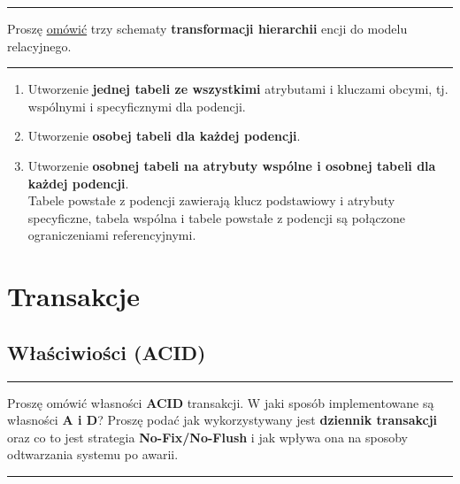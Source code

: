 \documentclass[a5paper,6pt]{article}
\newcommand{\horrule}[1]{\rule{\linewidth}{#1}}
\begin{document}
    \horrule{0.5pt}
    Proszę \underline{omówić} trzy schematy \textbf{transformacji hierarchii}
    encji do modelu relacyjnego.\\
    \horrule{0.5pt}

    \begin{enumerate}
        \item Utworzenie \textbf{jednej tabeli ze wszystkimi} atrybutami i
              kluczami obcymi, tj. wspólnymi i specyficznymi dla podencji.
        \item Utworzenie \textbf{osobej tabeli dla każdej podencji}.
        \item Utworzenie \textbf{osobnej tabeli na atrybuty wspólne i osobnej
              tabeli dla każdej podencji}.\\
              Tabele powstałe z podencji zawierają klucz podstawiowy i atrybuty
              specyficzne, tabela wspólna i tabele powstałe z podencji są
              połączone ograniczeniami referencyjnymi.
    \end{enumerate}


    \section{Transakcje} %
    \label{sec:transakcje}

    \subsection{Właściwiości (ACID)} %
    \label{sub:wlasciwiosci}

    \horrule{0.5pt}
     Proszę omówić własności \textbf{ACID} transakcji. W jaki sposób
          implementowane są własności \textbf{A i D}? Proszę podać jak
          wykorzystywany jest \textbf{dziennik transakcji} oraz co to jest
          strategia \textbf{No-Fix/No-Flush} i jak wpływa ona na sposoby
          odtwarzania systemu po awarii.\\
    \horrule{0.5pt}
\end{document}
